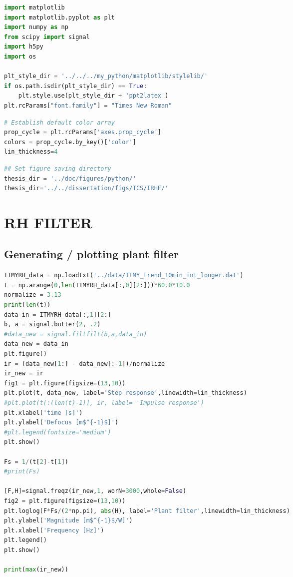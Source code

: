 \begin{spacing}{1} \begin{lstlisting}[language=Python]
import matplotlib
import matplotlib.pyplot as plt
import numpy as np
from scipy import signal
import h5py
import os

plt_style_dir = '../../../my_python/matplotlib/stylelib/'
if os.path.isdir(plt_style_dir) == True:
    plt.style.use(plt_style_dir + 'ppt2latex')
plt.rcParams["font.family"] = "Times New Roman"
\end{lstlisting} \end{spacing}

\begin{spacing}{1} \begin{lstlisting}[language=Python]
# Establish default color array
prop_cycle = plt.rcParams['axes.prop_cycle']
colors = prop_cycle.by_key()['color']
lin_thickness=4
\end{lstlisting} \end{spacing}

\begin{spacing}{1} \begin{lstlisting}[language=Python]
## Set figure saving directory
thesis_dir = '../doc/figures/python/'
thesis_dir='../../dissertation/figs/TCS/IRHF/'
\end{lstlisting} \end{spacing}

\hypertarget{rh-filter}{%
\section{RH FILTER}\label{rh-filter}}

\hypertarget{generating-plotting-plant-filter}{%
\subsection{Generating / plotting plant
filter}\label{generating-plotting-plant-filter}}

\begin{spacing}{1} \begin{lstlisting}[language=Python]
ITMYRH_data = np.loadtxt('../data/ITMY_trend_10min_int_longer.dat')
t = np.arange(0,len(ITMYRH_data[:,0][2:]))*60.0*10.0
normalize = 3.13
print(len(t))
data_in = ITMYRH_data[:,1][2:]
b, a = signal.butter(2, .2)
#data_new = signal.filtfilt(b,a,data_in)
data_new = data_in
plt.figure()
ir = (data_new[1:] - data_new[:-1])/normalize
ir_new = ir
fig1 = plt.figure(figsize=(13,10))
plt.plot(t, data_new, label='Step response',linewidth=lin_thickness)
#plt.plot(t[:(len(t)-1)], ir, label= 'Impulse response')
plt.xlabel('time [s]')
plt.ylabel('Defocus [m$^{-1}$]')
#plt.legend(fontsize='medium')
plt.show()

Fs = 1/(t[2]-t[1])
#print(Fs)

[F,H]=signal.freqz(ir_new,1, worN=3000,whole=False) 
fig2 = plt.figure(figsize=(13,10))
plt.loglog(F*Fs/(2*np.pi), abs(H), label='Plant filter',linewidth=lin_thickness)
plt.ylabel('Magnitude [m$^{-1}$/W]')
plt.xlabel('Frequency [Hz]')
plt.legend()
plt.show()

print(max(ir_new))
\end{lstlisting} \end{spacing}

